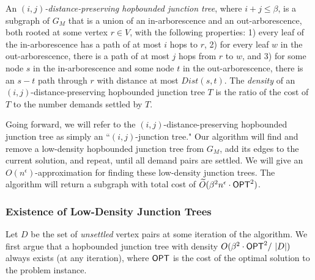 \begin{definition} 
     An \textit{$(i,j)$-distance-preserving hopbounded junction tree}, where $i + j \leq \beta$, is a subgraph of $G_M$ that is a union of an in-arborescence and an out-arborescence, both rooted at some vertex $r \in V$, with the following properties: 1) every leaf of the in-arborescence has a path of at most $i$ hops to $r$, 2) for every leaf $w$ in the out-arborescence, there is a path of at most $j$ hops from $r$ to $w$, and 3) for some node $s$ in the in-arborescence and some node $t$ in the out-arborescence, there is an  $s-t$ path through $r$ with distance at most $Dist(s,t)$. The \textit{density} of an $(i,j)$-distance-preserving hopbounded junction tree $T$ is the ratio of the cost of $T$ to the number demands settled by $T$. 
\end{definition}

Going forward, we will refer to the $(i,j)$-distance-preserving hopbounded junction tree as simply an ``$(i,j)$-junction tree." Our algorithm will find and remove a low-density hopbounded junction tree from $G_M$, add its edges to the current solution, and repeat, until all demand pairs are settled. 
We will give an $O(n^\epsilon)$-approximation for finding these low-density junction trees. The algorithm will return a subgraph with total cost of $\widetilde{O} (\beta^2 n^\epsilon \cdot {{{\sf OPT}}}^2 )$.

\subsubsection{Existence of Low-Density Junction Trees}
Let $D$ be the set of \textit{unsettled} vertex pairs at some iteration of the algorithm.
We first argue that a hopbounded junction tree with density $O (\beta^2 \cdot {{\sf OPT}}^2 / \mbox{ } |D| )$ always exists (at any iteration), where ${{\sf OPT}}$ is the cost of the optimal solution to the problem instance. 

